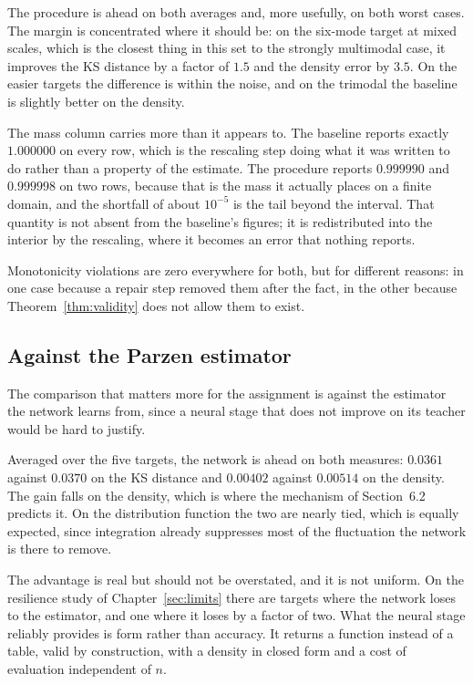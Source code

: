 \documentclass[11pt]{article}
\begin{document}
The procedure is ahead on both averages and, more usefully, on both worst cases. The
margin is concentrated where it should be: on the six-mode target at mixed scales, which is
the closest thing in this set to the strongly multimodal case, it improves the KS distance by
a factor of $1.5$ and the density error by $3.5$. On the easier targets the difference is
within the noise, and on the trimodal the baseline is slightly better on the density.

The mass column carries more than it appears to. The baseline reports exactly $1.000000$ on
every row, which is the rescaling step doing what it was written to do rather than a property
of the estimate. The procedure reports $0.999990$ and $0.999998$ on two rows, because that
is the mass it actually places on a finite domain, and the shortfall of about $10^{-5}$ is the
tail beyond the interval. That quantity is not absent from the baseline's figures; it is
redistributed into the interior by the rescaling, where it becomes an error that nothing
reports.

Monotonicity violations are zero everywhere for both, but for different reasons: in one case
because a repair step removed them after the fact, in the other because
Theorem~\ref{thm:validity} does not allow them to exist.

\subsection{Against the Parzen estimator}

The comparison that matters more for the assignment is against the estimator the network
learns from, since a neural stage that does not improve on its teacher would be hard to
justify.

Averaged over the five targets, the network is ahead on both measures: $0.0361$ against
$0.0370$ on the KS distance and $0.00402$ against $0.00514$ on the density. The gain falls on
the density, which is where the mechanism of Section~6.2 predicts it. On the distribution
function the two are nearly tied, which is equally expected, since integration already
suppresses most of the fluctuation the network is there to remove.

The advantage is real but should not be overstated, and it is not uniform. On the resilience
study of Chapter~\ref{sec:limits} there are targets where the network loses to the estimator,
and one where it loses by a factor of two. What the neural stage reliably provides is form
rather than accuracy. It returns a function instead of a table, valid by construction, with a
density in closed form and a cost of evaluation independent of $n$.
\end{document}
